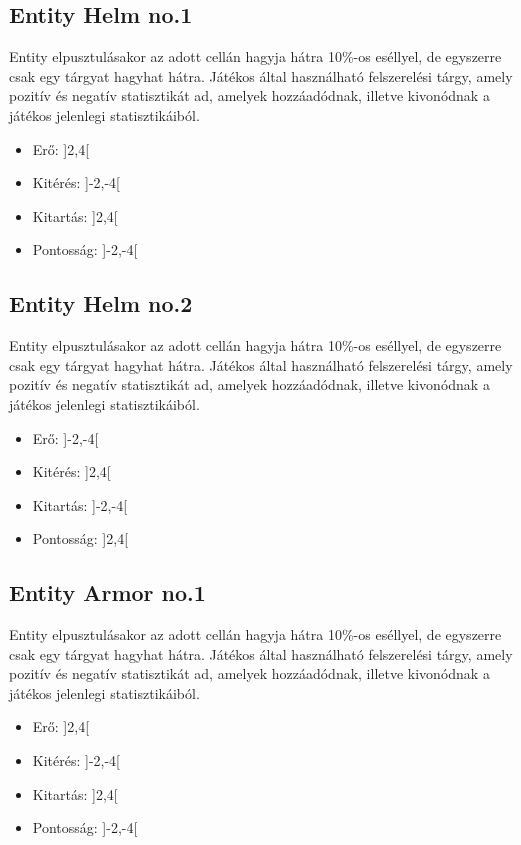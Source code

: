\subsection{Entity Helm no.1}

Entity elpusztulásakor az adott cellán hagyja hátra 10\%-os eséllyel, de egyszerre csak egy tárgyat hagyhat hátra.
Játékos által használható felszerelési tárgy, amely pozitív és negatív statisztikát ad, amelyek hozzáadódnak, illetve kivonódnak a játékos jelenlegi statisztikáiból.

\begin{itemize}
    \item Erő: ]2,4[
    \item Kitérés: ]-2,-4[
    \item Kitartás: ]2,4[
    \item Pontosság: ]-2,-4[
\end{itemize}

\subsection{Entity Helm no.2}

Entity elpusztulásakor az adott cellán hagyja hátra 10\%-os eséllyel, de egyszerre csak egy tárgyat hagyhat hátra.
Játékos által használható felszerelési tárgy, amely pozitív és negatív statisztikát ad, amelyek hozzáadódnak, illetve kivonódnak a játékos jelenlegi statisztikáiból.

\begin{itemize}
    \item Erő: ]-2,-4[
    \item Kitérés: ]2,4[
    \item Kitartás: ]-2,-4[
    \item Pontosság: ]2,4[
\end{itemize}

\subsection{Entity Armor no.1}

Entity elpusztulásakor az adott cellán hagyja hátra 10\%-os eséllyel, de egyszerre csak egy tárgyat hagyhat hátra.
Játékos által használható felszerelési tárgy, amely pozitív és negatív statisztikát ad, amelyek hozzáadódnak, illetve kivonódnak a játékos jelenlegi statisztikáiból.

\begin{itemize}
    \item Erő: ]2,4[
    \item Kitérés: ]-2,-4[
    \item Kitartás: ]2,4[
    \item Pontosság: ]-2,-4[
\end{itemize}

